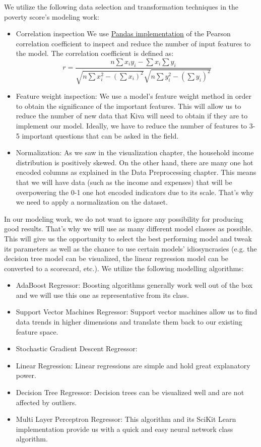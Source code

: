 \documentclass{article}
\begin{document}
We utilize the following data selection and transformation techniques in the poverty score’s modeling work:
\begin{itemize}
  \item Correlation inspection We use \href{http://pandas.pydata.org/pandas-docs/version/0.17.0/generated/pandas.DataFrame.corr.html}{Pandas implementation} of the Pearson correlation coefficient to inspect and reduce the number of input features to the model. The correlation coefficient is defined as:
    \begin{equation}
      r = \frac{n \sum x_i y_i - \sum x_i \sum y_i}{\sqrt{n \sum x_i^2 - (\sum x_i)^2} \sqrt{n \sum y_i^2 - (\sum y_i)^2}}
    \end{equation}
  \item Feature weight inspection: We use a model’s feature weight method in order to obtain the significance of the important features. This will allow us to reduce the number of new data that Kiva will need to obtain if they are to implement our model. Ideally, we have to reduce the number of features to 3-5 important questions that can be asked in the field.
  \item Normalization: As we saw in the visualization chapter, the household income distribution is positively skewed. On the other hand, there are many one hot encoded columns as explained in the Data Preprocessing chapter. This means that we will have data (such as the income and expenses) that will be overpowering the 0-1 one hot encoded indicators due to its scale. That’s why we need to apply a normalization on the dataset.
\end{itemize}

In our modeling work, we do not want to ignore any possibility for producing good results. That’s why we will use as many different model classes as possible. This will give us the opportunity to select the best performing model and tweak its parameters as well as the chance to use certain models’ idiosyncrasies (e.g. the decision tree model can be visualized, the linear regression model can be converted to a scorecard, etc.).  We utilize the following modelling algorithms:
\begin{itemize}
  \item AdaBoost Regressor: Boosting algorithms generally work well out of the box and we will use this one as representative from its class.
  \item Support Vector Machines Regressor: Support vector machines allow us to find data trends in higher dimensions and translate them back to our existing feature space.
  \item Stochastic Gradient Descent Regressor:
  \item Linear Regression: Linear regressions are simple and hold great explanatory power.
  \item Decision Tree Regressor: Decision trees can be visualized well and are not affected by outliers.
  \item Multi Layer Perceptron Regressor: This algorithm and its SciKit Learn implementation provide us with a quick and easy neural network class algorithm.
\end{itemize}
\end{document}
